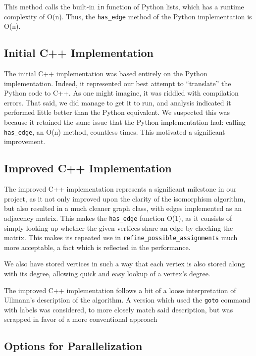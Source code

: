 \documentclass{article}
\begin{document}
  This method calls the built-in \texttt{in} function of Python lists, which has a runtime complexity of O(n).\cite{bigopy} Thus, the \texttt{has\_edge} method of the Python implementation is O(n).

  \subsection{Initial C++ Implementation}

  The initial C++ implementation was based entirely on the Python implementation. Indeed, it represented our best attempt to ``translate'' the Python code to C++. As one might imagine, it was riddled with compilation errors. That said, we did manage to get it to run, and analysis indicated it performed little better than the Python equivalent. We suspected this was because it retained the same issue that the Python implementation had: calling \texttt{has\_edge}, an O(n) method, countless times. This motivated a significant improvement.

  \subsection{Improved C++ Implementation}

  The improved C++ implementation represents a significant milestone in our project, as it not only improved upon the clarity of the isomorphism algorithm, but also resulted in a much cleaner graph class, with edges implemented as an adjacency matrix. This makes the \texttt{has\_edge} function O(1), as it consists of simply looking up whether the given vertices share an edge by checking the matrix. This makes its repeated use in \texttt{refine\_possible\_assignments} much more acceptable, a fact which is reflected in the performance.

  We also have stored vertices in such a way that each vertex is also stored along with its degree, allowing quick and easy lookup of a vertex's degree.

  The improved C++ implementation follows a bit of a loose interpretation of Ullmann's description of the algorithm. A version which used the \texttt{goto} command with labels was considered, to more closely match said description, but was scrapped in favor of a more conventional approach

  \subsection{Options for Parallelization}
    
\end{document}
